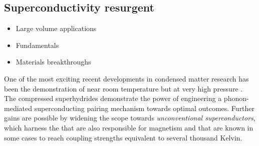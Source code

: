 \twocolumngrid


\subsection*{Superconductivity resurgent}
\noindent
\begin{itemize}
  \item Large volume applications
  \item Fundamentals
  \item Materials breakthroughs
\end{itemize}

One of the most exciting recent developments in condensed matter research has been the
demonstration of  near room temperature but at very high pressure
\cite{snider20,drozdov19,somayazulu19}. 
The compressed superhydrides demonstrate the power of engineering a phonon-mediated superconducting pairing mechanism towards optimal outcomes. Further gains are possible by widening the scope towards 
\emph{unconventional superconductors}, which harness the  that are also responsible for magnetism and that are
known in some cases to reach coupling strengths equivalent to several
thousand Kelvin. %




